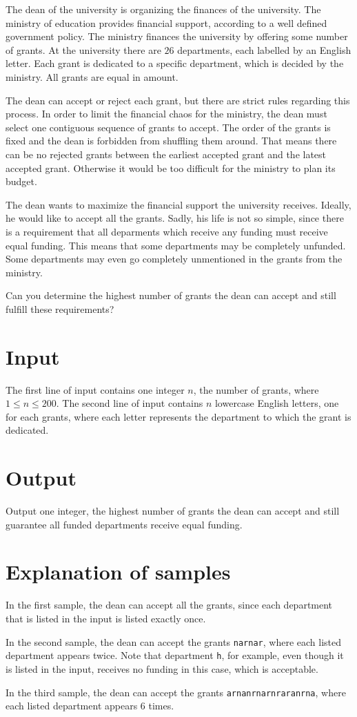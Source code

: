 
The dean of the university is organizing the finances of the university.
The ministry of education provides financial support, according to a well defined government policy.
The ministry finances the university by offering some number of grants.
At the university there are $26$ departments, each labelled by an English letter.
Each grant is dedicated to a specific department, which is decided by the ministry.
All grants are equal in amount.

The dean can accept or reject each grant, but there are strict rules regarding this process.
In order to limit the financial chaos for the ministry, the dean must select one contiguous sequence of grants to accept.
The order of the grants is fixed and the dean is forbidden from shuffling them around.
That means there can be no rejected grants between the earliest accepted grant and the latest accepted grant.
Otherwise it would be too difficult for the ministry to plan its budget.

The dean wants to maximize the financial support the university receives.
Ideally, he would like to accept all the grants.
Sadly, his life is not so simple, since there is a requirement that all deparments which receive any funding must receive equal funding.
This means that some departments may be completely unfunded.
Some departments may even go completely unmentioned in the grants from the ministry.

Can you determine the highest number of grants the dean can accept and still fulfill these requirements?

\section*{Input}
The first line of input contains one integer $n$, the number of grants, where $1 \leq n \leq 200$.
The second line of input contains $n$ lowercase English letters, one for each grants, where each letter represents the department to which the grant is dedicated.

\section*{Output}
Output one integer, the highest number of grants the dean can accept and still guarantee all funded departments receive equal funding.

\section*{Explanation of samples}
In the first sample, the dean can accept all the grants, since each department that is listed in the input is listed exactly once.

In the second sample, the dean can accept the grants \texttt{narnar}, where each listed department appears twice. Note that department \texttt{h}, for example, even though it is listed in the input, receives no funding in this case, which is acceptable.

In the third sample, the dean can accept the grants \texttt{arnanrnarnraranrna}, where each listed department appears $6$ times.
